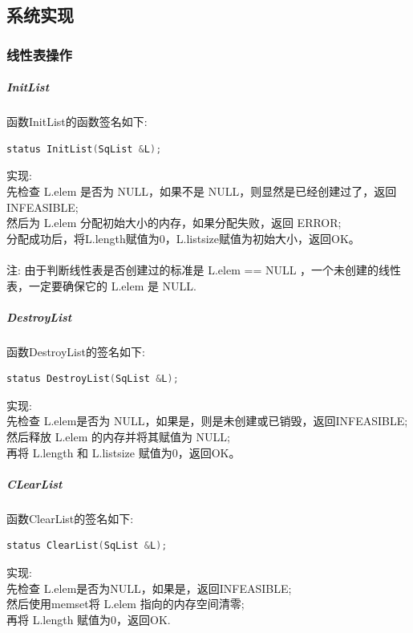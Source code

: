 \documentclass[supercite]{Experimental_Report}
\theoremstyle{definition}
\begin{document}
\subsection{系统实现}

\subsubsection{线性表操作}

\subparagraph{InitList}
\noindent
函数InitList的函数签名如下:
\begin{lstlisting}[language=C++, frame=single]
status InitList(SqList &L);
\end{lstlisting}

\noindent
实现: \\
先检查 L.elem 是否为 NULL，如果不是 NULL，则显然是已经创建过了，返回 INFEASIBLE; \\
然后为 L.elem 分配初始大小的内存，如果分配失败，返回 ERROR; \\
分配成功后，将L.length赋值为0，L.listsize赋值为初始大小，返回OK。\\
\\
\noindent
注: 由于判断线性表是否创建过的标准是 L.elem == NULL ，一个未创建的线性表，一定要确保它的 L.elem 是 NULL.\\

\subparagraph{DestroyList}
\noindent
函数DestroyList的签名如下:
\begin{lstlisting}[language=C++, frame=single]
status DestroyList(SqList &L);
\end{lstlisting}

\noindent
实现: \\
先检查 L.elem是否为 NULL，如果是，则是未创建或已销毁，返回INFEASIBLE; \\
然后释放 L.elem 的内存并将其赋值为 NULL; \\
再将 L.length 和 L.listsize 赋值为0，返回OK。\\

\subparagraph{CLearList}
\noindent
函数ClearList的签名如下:
\begin{lstlisting}[language=C++, frame=single]
status ClearList(SqList &L);
\end{lstlisting}

\noindent
实现: \\
先检查 L.elem是否为NULL，如果是，返回INFEASIBLE; \\
然后使用memset将 L.elem 指向的内存空间清零; \\
再将 L.length 赋值为0，返回OK.\\
\end{document}
